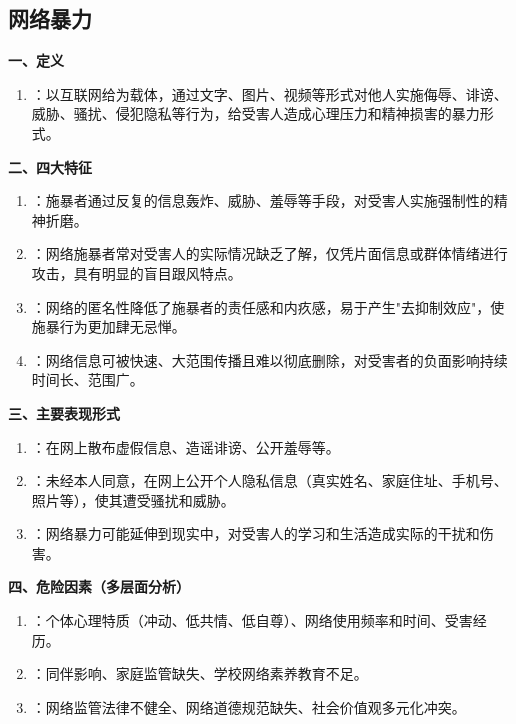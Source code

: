 \subsection{网络暴力}

\begin{keybox}
\textbf{一、定义}
\begin{enumerate}[leftmargin=*]
    \item {}：以互联网给为载体，通过文字、图片、视频等形式对他人实施侮辱、诽谤、威胁、骚扰、侵犯隐私等行为，给受害人造成心理压力和精神损害的暴力形式。
\end{enumerate}

\textbf{二、四大特征}
\begin{enumerate}[leftmargin=*]
    \item {}：施暴者通过反复的信息轰炸、威胁、羞辱等手段，对受害人实施强制性的精神折磨。
    \item {}：网络施暴者常对受害人的实际情况缺乏了解，仅凭片面信息或群体情绪进行攻击，具有明显的盲目跟风特点。
    \item {}：网络的匿名性降低了施暴者的责任感和内疚感，易于产生"去抑制效应"，使施暴行为更加肆无忌惮。
    \item {}：网络信息可被快速、大范围传播且难以彻底删除，对受害者的负面影响持续时间长、范围广。
\end{enumerate}

\textbf{三、主要表现形式}
\begin{enumerate}[leftmargin=*]
    \item {}：在网上散布虚假信息、造谣诽谤、公开羞辱等。
    \item {}：未经本人同意，在网上公开个人隐私信息（真实姓名、家庭住址、手机号、照片等），使其遭受骚扰和威胁。
    \item {}：网络暴力可能延伸到现实中，对受害人的学习和生活造成实际的干扰和伤害。
\end{enumerate}

\textbf{四、危险因素（多层面分析）}
\begin{enumerate}[leftmargin=*]
    \item {}：个体心理特质（冲动、低共情、低自尊）、网络使用频率和时间、受害经历。
    \item {}：同伴影响、家庭监管缺失、学校网络素养教育不足。
    \item {}：网络监管法律不健全、网络道德规范缺失、社会价值观多元化冲突。
\end{enumerate}


\end{keybox}
